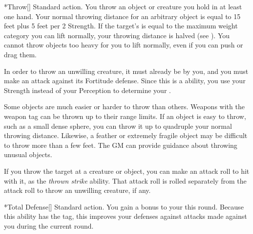         \begin{activeability}*{Throw}[]
            \abilityusagetime Standard action.
            \rankline
            You throw an object or creature you hold in at least one hand.
            Your normal throwing distance for an arbitrary object is equal to 15 feet plus 5 feet per 2 Strength.
            If the target's  is equal to the maximum weight category you can lift normally, your throwing distance is halved (see ).
            You cannot throw objects too heavy for you to lift normally, even if you can push or drag them.

            In order to throw an unwilling creature, it must already be \grappled by you, and you must make an attack against its Fortitude defense.
            Since this is a  ability, you use your Strength instead of your Perception to determine your .

            Some objects are much easier or harder to throw than others.
            Weapons with the  weapon tag can be thrown up to their range limits.
            If an object is easy to throw, such as a small dense sphere, you can throw it up to quadruple your normal throwing distance.
            Likewise, a feather or extremely fragile object may be difficult to throw more than a few feet.
            The GM can provide guidance about throwing unusual objects.

            If you throw the target at a creature or object, you can make an attack roll to hit with it, as the \textit{thrown strike} ability.
            That attack roll is rolled separately from the attack roll to throw an unwilling creature, if any.
        \end{activeability}

        \begin{activeability}*{Total Defense}[]
            \abilityusagetime Standard action.
            \rankline
            You gain a  bonus to your  this round.
            Because this ability has the  tag, this improves your defenses against attacks made against you during the current round.
        \end{activeability}

